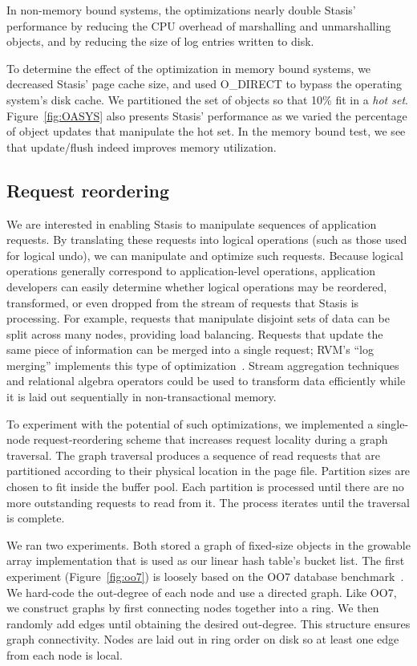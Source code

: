 \documentclass[letterpaper,twocolumn,10pt]{article}
\newcommand{\yad}{Stasis\xspace}
\newcommand{\yads}{Stasis'\xspace}
\begin{document}
In non-memory bound systems, the optimizations nearly double \yads
performance by reducing the CPU overhead of marshalling and
unmarshalling objects, and by reducing the size of log entries written
to disk.

To determine the effect of the optimization in memory bound systems,
we decreased \yads page cache size, and used O\_DIRECT to bypass the
operating system's disk cache.  We partitioned the set of objects
so that 10\% fit in a {\em hot set}.
Figure~\ref{fig:OASYS} also presents \yads performance as we varied the
percentage of object updates that manipulate the hot set.  In the
memory bound test, we see that update/flush indeed improves memory
utilization.

\subsection{Request reordering}

We are interested in enabling \yad to manipulate sequences of
application requests.  By translating these requests into logical
operations (such as those used for logical undo),  we can 
manipulate and optimize such requests.  Because logical operations generally
correspond to application-level operations, application developers can easily determine whether
logical operations may be reordered, transformed, or even dropped from
the stream of requests that \yad is processing.  For example,
requests that manipulate disjoint sets of data can be split across
many nodes, providing load balancing.  Requests that update the same piece of information
can be merged into a single request; RVM's ``log merging''
implements this type of optimization~\cite{lrvm}.  Stream aggregation
techniques and relational algebra operators could be used to
 transform data efficiently while it is laid out sequentially in
non-transactional memory.

To experiment with the potential of such optimizations, we implemented
a single-node request-reordering scheme that increases request locality
during a graph traversal.  The graph traversal produces a sequence of
read requests that are partitioned according to their physical
location in the page file.  Partition sizes are chosen to fit inside
the buffer pool.  Each partition is processed until there are no more
outstanding requests to read from it.  The process iterates until the
traversal is complete.

We ran two experiments.  Both stored a graph of fixed-size objects in
the growable array implementation that is used as our linear
hash table's bucket list.
The first experiment (Figure~\ref{fig:oo7})
is loosely based on the OO7 database benchmark~\cite{oo7}.  We
hard-code the out-degree of each node and use a directed graph.  Like OO7, we
construct graphs by first connecting nodes together into a ring.
We then randomly add edges until obtaining the desired
out-degree.  This structure ensures graph connectivity.
Nodes are laid out in ring order on disk so at least
one edge from each node is local.
\end{document}
